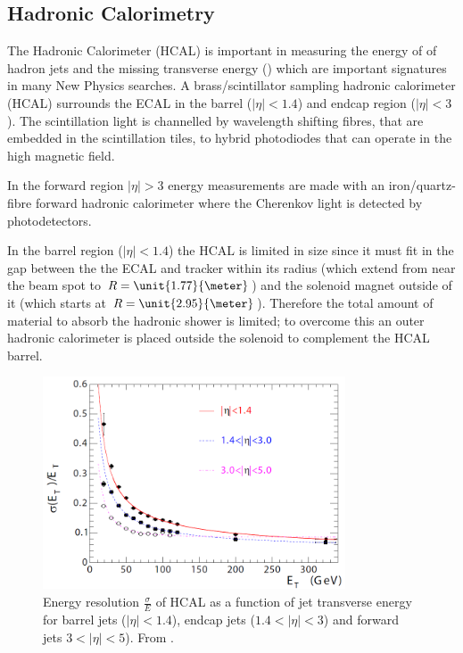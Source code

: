 \subsection{Hadronic Calorimetry}
The Hadronic Calorimeter (HCAL) is important in measuring the energy of of
hadron jets and the missing transverse energy (\met) which are important
signatures in many New Physics searches.
A brass/scintillator sampling hadronic calorimeter (HCAL) surrounds the ECAL in
the barrel ($|\eta| < 1.4$) and endcap region ($|\eta| < 3$). 
The scintillation light is channelled by wavelength shifting fibres, that are
embedded in the scintillation tiles, to hybrid photodiodes that can operate in
the high magnetic field. \cite{cms}

In the forward region $|\eta| > 3$ energy measurements are made with an
iron/quartz-fibre forward hadronic calorimeter where the Cherenkov light is
detected by photodetectors.\cite{cms}

In the barrel region ($|\eta| < 1.4$) the HCAL is limited in size since it must
fit in the gap between the the ECAL and tracker within its radius (which extend
from near the beam spot to $R = \unit{1.77}{\meter}$) and the solenoid magnet
outside of it (which starts at $R = \unit{2.95}{\meter}$).
Therefore the total amount of material to absorb the hadronic shower is
limited; to overcome this an outer hadronic calorimeter is placed outside the
solenoid to complement the HCAL barrel.\cite{cms}

\begin{figure}[htb!]
  \centering
  \includegraphics[width=0.8\textwidth]{HCAL}
  \caption{Energy resolution $\frac{\sigma}{E}$ of HCAL as a function of jet
  \label{fig:HCAL}
transverse energy for barrel jets ($|\eta| < 1.4$), endcap jets ($1.4<|\eta| <
3$) and forward jets $3<|\eta| < 5$). From \cite{cms}.}
\end{figure}


